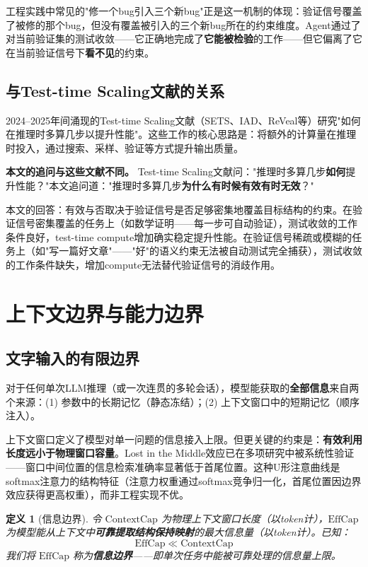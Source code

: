 \documentclass[11pt,a4paper]{ctexart}
\newtheorem{definition}[theorem]{定义}
\begin{document}
工程实践中常见的"修一个bug引入三个新bug"正是这一机制的体现：验证信号覆盖了被修的那个bug，但没有覆盖被引入的三个新bug所在的约束维度。Agent通过了对当前验证集的测试收敛——它正确地完成了\textbf{它能被检验}的工作——但它偏离了它在当前验证信号下\textbf{看不见}的约束。

\subsection{与Test-time Scaling文献的关系}

2024--2025年间涌现的Test-time Scaling文献（SETS、IAD、ReVeal等）研究"如何在推理时多算几步以提升性能"。这些工作的核心思路是：将额外的计算量在推理时投入，通过搜索、采样、验证等方式提升输出质量。

\textbf{本文的追问与这些文献不同。} Test-time Scaling文献问："推理时多算几步\textbf{如何}提升性能？"本文追问道："推理时多算几步\textbf{为什么有时候有效有时无效}？"

本文的回答：有效与否取决于验证信号是否足够密集地覆盖目标结构的约束。在验证信号密集覆盖的任务上（如数学证明——每一步可自动验证），测试收敛的工作条件良好，test-time compute增加确实稳定提升性能。在验证信号稀疏或模糊的任务上（如"写一篇好文章"——"好"的语义约束无法被自动测试完全捕获），测试收敛的工作条件缺失，增加compute无法替代验证信号的消歧作用。


\section{上下文边界与能力边界}

\subsection{文字输入的有限边界}

对于任何单次LLM推理（或一次连贯的多轮会话），模型能获取的\textbf{全部信息}来自两个来源：(1) 参数中的长期记忆（静态冻结）；(2) 上下文窗口中的短期记忆（顺序注入）。

上下文窗口定义了模型对单一问题的信息接入上限。但更关键的约束是：\textbf{有效利用长度远小于物理窗口容量}。Lost in the Middle效应\cite{Liu2024LostMiddle}已在多项研究中被系统性验证——窗口中间位置的信息检索准确率显著低于首尾位置。这种U形注意曲线是softmax注意力的结构特征（注意力权重通过softmax竞争归一化，首尾位置因边界效应获得更高权重），而非工程实现不优。

\begin{definition}[信息边界]
    令 $\mathrm{ContextCap}$ 为物理上下文窗口长度（以token计），$\mathrm{EffCap}$ 为模型能从上下文中\textbf{可靠提取结构保持映射}的最大信息量（以token计）。已知：
    \begin{equation}
        \mathrm{EffCap} \ll \mathrm{ContextCap}
    \end{equation}
    我们将 $\mathrm{EffCap}$ 称为\textbf{信息边界}——即单次任务中能被可靠处理的信息量上限。
\end{definition}
\end{document}
